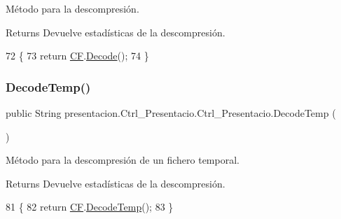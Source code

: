 Método para la descompresión. 

\begin{DoxyReturn}{Returns}
Devuelve estadísticas de la descompresión. 
\end{DoxyReturn}

\begin{DoxyCode}
72                            \{
73         \textcolor{keywordflow}{return} \hyperlink{classpresentacion_1_1Ctrl__Presentacio_1_1Ctrl__Presentacio_af46ef2ef420276ff830c2f0ff8c1a7e6}{CF}.\hyperlink{classdomini_1_1folders_1_1Ctrl__FolderFile_a5d28ac7f5223ecd40a242148e86447c1}{Decode}();
74     \}
\end{DoxyCode}
\mbox{\label{classpresentacion_1_1Ctrl__Presentacio_1_1Ctrl__Presentacio_aa9c12bc59a7e9fa0ccd09c0e007d4a4c}} 
\subsubsection{\texorpdfstring{Decode\+Temp()}{DecodeTemp()}}
{\footnotesize\ttfamily public String presentacion.\+Ctrl\+\_\+\+Presentacio.\+Ctrl\+\_\+\+Presentacio.\+Decode\+Temp (\begin{DoxyParamCaption}{ }\end{DoxyParamCaption})\hspace{0.3cm}{\ttfamily [inline]}}



Método para la descompresión de un fichero temporal. 

\begin{DoxyReturn}{Returns}
Devuelve estadísticas de la descompresión. 
\end{DoxyReturn}

\begin{DoxyCode}
81                                \{
82         \textcolor{keywordflow}{return} \hyperlink{classpresentacion_1_1Ctrl__Presentacio_1_1Ctrl__Presentacio_af46ef2ef420276ff830c2f0ff8c1a7e6}{CF}.\hyperlink{classdomini_1_1folders_1_1Ctrl__FolderFile_afa0f6968113855feccccfdbacc00444e}{DecodeTemp}();
83     \}
\end{DoxyCode}
\mbox{\label{classpresentacion_1_1Ctrl__Presentacio_1_1Ctrl__Presentacio_a83ea715afbbe389c6f1fb68f29121205}} 
